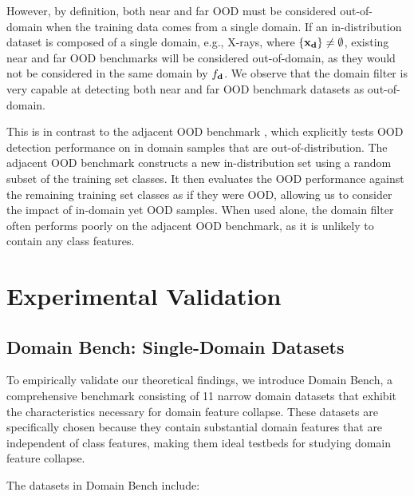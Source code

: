 \documentclass[11pt, oneside]{book}
\theoremstyle{plain}
\theoremstyle{definition}
\theoremstyle{remark}
\begin{document}
However, by definition, both near and far OOD must be considered out-of-domain when the training data comes from a single domain. If an in-distribution dataset is composed of a single domain, e.g., X-rays, where $\{{\mathbf{x}}_{\mathbf{d}}\} \neq \emptyset$, existing near and far OOD benchmarks will be considered out-of-domain, as they would not be considered in the same domain by $f_{\mathbf{d}}$. We observe that the domain filter is very capable at detecting both near and far OOD benchmark datasets as out-of-domain.

This is in contrast to the adjacent OOD benchmark \citep{yangcan}, which explicitly tests OOD detection performance on in domain samples that are out-of-distribution. The adjacent OOD benchmark constructs a new in-distribution set using a random subset of the training set classes. It then evaluates the OOD performance against the remaining training set classes as if they were OOD, allowing us to consider the impact of in-domain yet OOD samples. When used alone, the domain filter often performs poorly on the adjacent OOD benchmark, as it is unlikely to contain any class features.

\section{Experimental Validation}

\subsection{Domain Bench: Single-Domain Datasets}

To empirically validate our theoretical findings, we introduce Domain Bench, a comprehensive benchmark consisting of 11 narrow domain datasets that exhibit the characteristics necessary for domain feature collapse. These datasets are specifically chosen because they contain substantial domain features that are independent of class features, making them ideal testbeds for studying domain feature collapse.

The datasets in Domain Bench include:
\end{document}

